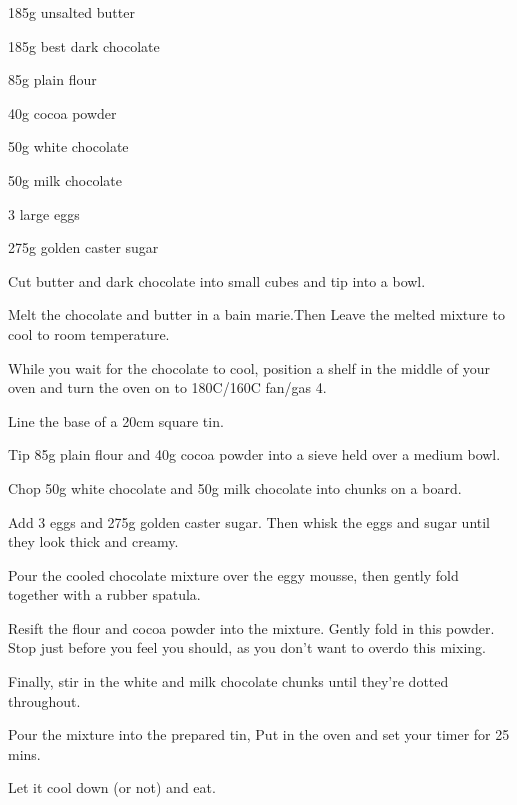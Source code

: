 \label{recipe:brownies}


\begin{ingredients}

  \item 185g unsalted butter
  \item 185g best dark chocolate
  \item 85g plain flour
  \item 40g cocoa powder
  \item 50g white chocolate
  \item 50g milk chocolate
  \item 3 large eggs
  \item 275g golden caster sugar
\end{ingredients}


\begin{method}
  	Cut butter and dark chocolate into small cubes and tip into a bowl.

Melt the chocolate and butter in a bain marie.Then Leave the melted mixture
to cool to room temperature.

While you wait for the chocolate to cool, position a shelf in the middle of
your oven and turn the oven on to 180C/160C fan/gas 4.

Line the base of a 20cm square tin.

Tip 85g plain flour and 40g cocoa powder into a sieve held over a medium
bowl.

Chop 50g white chocolate and 50g milk chocolate into chunks on a board.

Add 3 eggs and 275g golden caster sugar. Then whisk the eggs and sugar
until they look thick and creamy.

Pour the cooled chocolate mixture over the eggy mousse, then gently fold
together with a rubber spatula.

Resift the flour and cocoa powder into the mixture. Gently fold in this
powder. Stop just before you feel you should, as you don’t want to overdo
this mixing.

Finally, stir in the white and milk chocolate chunks until they’re dotted
throughout.

Pour the mixture into the prepared tin, Put in the oven and set your timer for
25 mins. 

Let it cool down (or not) and eat.

  
\end{method}


